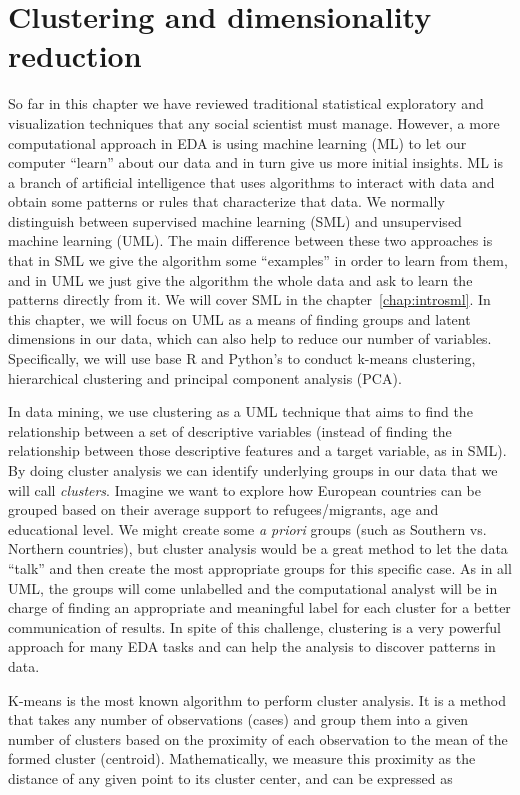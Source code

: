 \section{Clustering and dimensionality reduction}
\label{sec:clustering}

So far in this chapter we have reviewed traditional statistical exploratory and visualization techniques that any social scientist must manage. However, a more computational approach in EDA is using machine learning (ML) to let our computer “learn” about our data and in turn give us more initial insights.  ML is a branch of artificial intelligence that uses algorithms to interact with data and obtain some patterns or rules that characterize that data. We normally distinguish between supervised machine learning (SML) and unsupervised machine learning (UML). The main difference between these two approaches is that in SML we give the algorithm some “examples” in order to learn from them, and in UML we just give the algorithm the whole data and ask to learn the patterns directly from it. We will cover SML in the  chapter~\ref{chap:introsml}. In this chapter, we will focus on UML as a means of finding groups and latent dimensions in our data, which can also help to reduce our number of variables. Specifically, we will use base R and Python’s  to conduct k-means clustering, hierarchical clustering and principal component analysis (PCA). 

In data mining, we use clustering as a UML technique that aims to find the relationship between a set of descriptive variables (instead of finding the relationship between those descriptive features and a target variable, as in SML). By doing cluster analysis we can identify underlying groups in our data that we will call \textit{clusters}. Imagine we want to explore how European countries can be grouped based on their average support to refugees/migrants, age and educational level. We might create some \textit{a priori} groups (such as Southern vs. Northern countries), but cluster analysis would be a great method to let the data “talk” and then create the most appropriate groups for this specific case. As in all UML, the groups will come unlabelled and the computational analyst will be in charge of finding an appropriate and meaningful label for each cluster for a better communication of results. In spite of this challenge, clustering is a very powerful approach for many EDA tasks and can help the analysis to discover patterns in data.

K-means is the most known algorithm to perform cluster analysis. It is a method that takes any number of observations (cases) and group them into a given number of clusters based on the proximity of each observation to the mean of the formed cluster (centroid).  Mathematically, we measure this proximity as the distance of any given point to its cluster center, and can be expressed as

